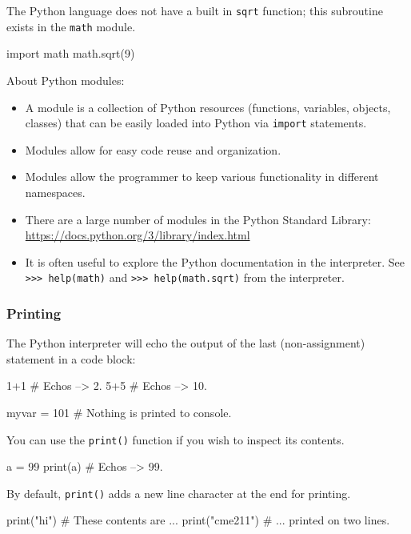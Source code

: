\documentclass[12pt,letterpaper,twoside]{article}
\begin{document}
The Python language does not have a built in \texttt{sqrt} function;
this subroutine exists in the \texttt{math} module.

\begin{python}
import math
math.sqrt(9)
\end{python}

About Python modules:

\begin{itemize}
\item
  A module is a collection of Python resources (functions, variables,
  objects, classes) that can be easily loaded into Python via
  \texttt{import} statements.
\item
  Modules allow for easy code reuse and organization.
\item
  Modules allow the programmer to keep various functionality in
  different namespaces.
\item
  There are a large number of modules in the Python Standard Library:
  \url{https://docs.python.org/3/library/index.html}
\item
  It is often useful to explore the Python documentation in the
  interpreter. See \newline
  \texttt{>>> help(math)} and
  \texttt{>>> help(math.sqrt)}
  from the interpreter.
\end{itemize}

\subsubsection{Printing}

The Python interpreter 
will echo the output of the last (non-assignment)
statement in a code block:

\begin{python}
1+1  # Echos --> 2.
5+5  # Echos --> 10.
\end{python}

\begin{python}
myvar = 101  # Nothing is printed to console.
\end{python}

You can use the \texttt{print()} function if you wish to inspect its contents.
\begin{python}
a = 99
print(a)    # Echos --> 99.
\end{python}

By default, \texttt{print()} adds a new line character at the end for
printing.

\begin{python}
print("hi")           # These contents are ...
print("cme211")       # ... printed on two lines.
\end{python}
\end{document}
